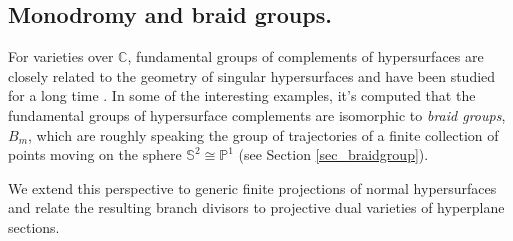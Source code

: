 \documentclass[12pt]{amsart}
\newcommand{\C}{\mathbb{C}} %
\begin{document}

\subsection{Monodromy and braid groups.\label{sec:braid-group-monodromy}}
For varieties over $\C$, fundamental groups of complements of hypersurfaces are closely related to the geometry of singular hypersurfaces and have been studied for a long time \cite{Zariskipair,Kampen33,MT88,DolLib81,Moishezon81,Dimca92}. In some of the interesting examples, it's computed that the fundamental groups of hypersurface complements are isomorphic to \emph{braid groups}, $B_m$, which are roughly speaking the group of trajectories of a finite collection of points moving on the sphere $\mathbb S^2\cong \mathbb{P}^1$ (see Section \ref{sec_braidgroup}). 

We extend this perspective to generic finite projections of normal hypersurfaces and relate the resulting branch divisors to projective dual varieties of hyperplane sections.
\end{document}
